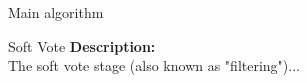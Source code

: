 \documentclass[10pt,a4paper]{article}
\begin{document}
\begin{section}{Main algorithm}
\begin{subsection}{Soft Vote}
\noindent \textbf{Description:}\\
The soft vote stage (also known as "filtering")...





\end{subsection}
    
       

\end{section}
\end{document}
